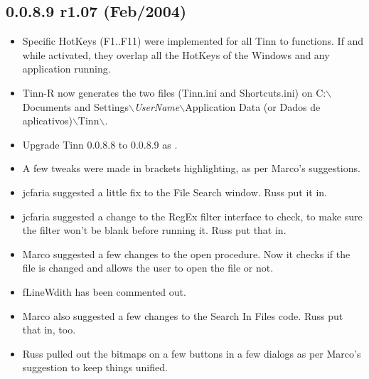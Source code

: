 \subsection*{0.0.8.9 r1.07 (Feb/2004)}
\begin{itemize}
  \item Specific HotKeys (F1..F11) were implemented for all Tinn to \RR{}
    functions. If and while activated, they overlap all the HotKeys of
    the Windows and any application running.
  \item Tinn-R now generates the two files (Tinn.ini and Shortcuts.ini) on
    C:$\backslash$Documents and Settings$\backslash$\textit{UserName}$\backslash$Application Data
    (or Dados de aplicativos)$\backslash$Tinn$\backslash$.
  \item Upgrade Tinn 0.0.8.8 to 0.0.8.9 as
    .
  \item A few tweaks were made in brackets highlighting, as per Marco's suggestions.
  \item jcfaria suggested a little fix to the File Search window. Russ put it in.
  \item jcfaria suggested a change to the RegEx filter interface to check,
    to make sure the filter won't be blank before running it. Russ put that in.
  \item Marco suggested a few changes to the open procedure. Now it checks if the
    file is changed and allows the user to open the file or not.
  \item fLineWdith has been commented out.
  \item Marco also suggested a few changes to the Search In Files code. Russ put that in, too.
  \item Russ pulled out the bitmaps on a few buttons in a few dialogs as per Marco's suggestion to keep things unified.
\end{itemize}


